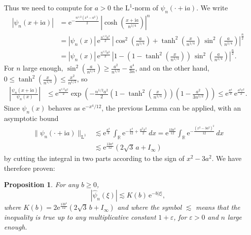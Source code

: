 \documentclass[12pt,a4paper,reqno]{amsart}
\newcommand{\R}{\mathbb{R}}
\newcommand{\E}{\mathrm{e}}
\newcommand{\I}{\mathrm{i}}
\newcommand{\eps}{\varepsilon}
\newcommand{\leb}{\mathrm{L}}
\newtheorem{proposition}[theorem]{Proposition}
\theoremstyle{remark}
\begin{document}
Thus we need to compute for $a>0$ the $\leb^1$-norm of $\psi_n(\cdot+\I a)$. We write
\begin{align*}
|\psi_n(x+\I a)| &= \E^{-\frac{n^{1/2}(x^2-a^2)}{2}}\,\left|\cosh\left(\frac{x+\I a}{n^{1/4}}\right)\right|^n\\
&=|\psi_n(x)|\, \E^{\frac{n^{1/2}a^2}{2}}\, \left|\cos^2\left(\frac{a}{n^{1/4}}\right)+ \tanh^2\left(\frac{x}{n^{1/4}}\right) \,\sin^2\left(\frac{a}{n^{1/4}}\right)\right|^{\frac{n}{2}}\\
&=|\psi_n(x)|\, \E^{\frac{n^{1/2}a^2}{2}}\, \left|1-\left(1- \tanh^2\left(\frac{x}{n^{1/4}}\right) \right)\,\sin^2\left(\frac{a}{n^{1/4}}\right)\right|^{\frac{n}{2}}.
\end{align*}
For $n$ large enough, $\sin^2(\frac{a}{n^{1/4}}) \geq \frac{a^2}{n^{1/2}}-\frac{a^4}{3n}$, and on the other hand, $0\leq \tanh^2\left(\frac{x}{n^{1/4}}\right) \leq \frac{x^2}{n^{1/2}}$, so
\begin{align*}
\left|\frac{\psi_n(x+\I a)}{\psi_n(x)}\right| &\leq \E^{\frac{n^{1/2}a^2}{2}} \exp\left(-\frac{n^{1/2}a^2}{2}\left(1- \tanh^2\left(\frac{x}{n^{1/4}}\right)\right) \left(1-\frac{a^2}{3n^{1/2}}\right)\right)\leq \E^{\frac{a^4}{3}}\,\E^{\frac{a^2x^2}{2}}.
\end{align*}
Since $\psi_n(x)$ behaves as $\E^{-x^4/12}$, the previous Lemma can be applied, with an asymptotic bound
\begin{align*}
\|\psi_n(\cdot + \I a)\|_{\leb^1} &\lesssim \E^{\frac{a^4}{3}}\,\int_{\R} \E^{-\frac{x^4}{12}+\frac{a^2x^2}{2}}\,dx = \E^{\frac{13a^4}{12}} \int_{\R} \E^{-\frac{(x^2-3a^2)^2}{12}}\,dx \\
&\lesssim  \E^{\frac{13a^4}{12}}\left(2\sqrt{3}\,a+I_\infty\right)
\end{align*}
by cutting the integral in two parts according to the sign of $x^2-3a^2$. We have therefore proven:

\begin{proposition}\label{prop:sizefourier}
For any $b \geq 0$, 
$$|\widehat{\psi}_n(\xi)| \lesssim K(b)\,\E^{-b|\xi|},$$
where $K(b) = 2\E^{\frac{13b^4}{12}}(2\sqrt{3}\,b+I_\infty)$ and where the symbol $\lesssim$ means that the inequality is true up to any multiplicative constant $1+\eps$, for $\eps>0$ and $n$ large enough.
\end{proposition}
\bigskip
\end{document}
